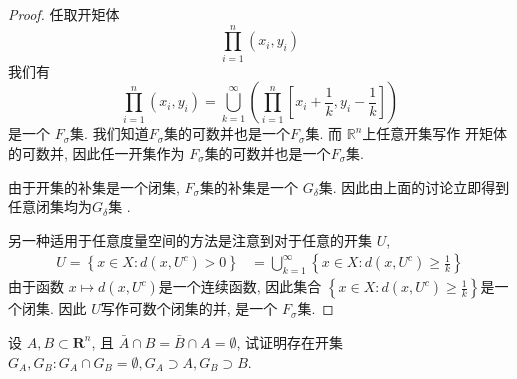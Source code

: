 \documentclass[../main.tex]{subfiles}
\begin{document}
    \begin{proof}
        任取开矩体 \[
    \prod _{i= 1}^{n} \left( x_{i},y_{i} \right) 
        \]我们有 \[
    \prod _{i= 1}^{n}\left( x_{i},y_{i} \right)= \bigcup _{k= 1}^{\infty}\left( \prod _{i= 1}^{n}\left[ x_{i}+ \frac{1 }{k },y_{i}-\frac{1 }{k }   \right] \right) 
        \]是一个 \( F_{ \sigma }  \)集. 我们知道\(  F_{ \sigma }\)集的可数并也是一个\(  F_{ \sigma }\)集. 而 \(  \mathbb{R} ^{n}  \)上任意开集写作 开矩体的可数并, 因此任一开集作为 \(  F_{ \sigma }  \)集的可数并也是一个\(   F_{ \sigma }  \)集.
        
    由于开集的补集是一个闭集,  \(  F_{ \sigma }  \)集的补集是一个 \(  G_{ \delta }  \)集. 因此由上面的讨论立即得到任意闭集均为\( G_{ \delta }\)集 .


    另一种适用于任意度量空间的方法是注意到对于任意的开集 \(  U  \),  \[
    \begin{aligned}
    U= \left\{ x \in X:d\left( x, U^{c} \right)> 0  \right\} &=  \bigcup _{k= 1}^{\infty}\left\{ x\in X: d\left( x,U^{c} \right)\ge \frac{1 }{k }   \right\}
    \end{aligned}
    \]由于函数 \(  x\mapsto d\left( x,U^{c} \right)   \)是一个连续函数, 因此集合 \(  \left\{ x \in X:d\left( x,U^{c} \right)\ge \frac{1 }{k }   \right\}  \)是一个闭集. 因此 \(  U  \)写作可数个闭集的并, 是一个 \(  F_{ \sigma }  \)集.    
    \end{proof}

\begin{exercise}{}{}
设 $A,B \subset \mathbf{R}^n$, 且 $\bar{A} \cap B = \bar{B} \cap A = \emptyset$, 试证明存在开集 $G_A, G_B: G_A \cap G_B = \emptyset, G_A \supset A, G_B \supset B$.
\end{exercise}
\end{document}
